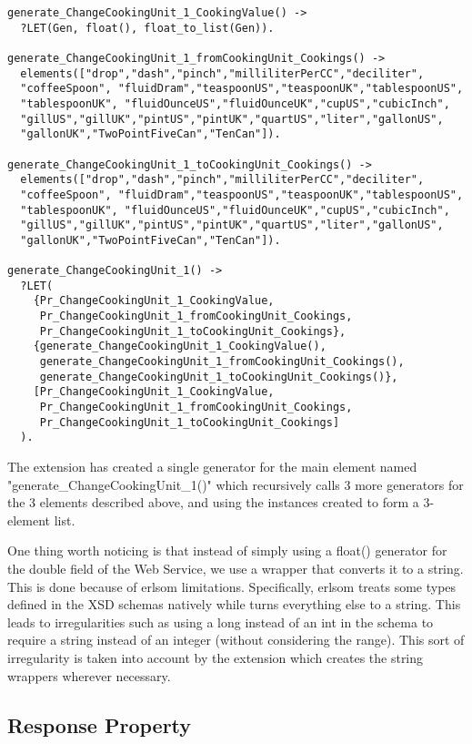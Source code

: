 \documentclass[11pt]{article} %
\begin{document}
\begin{lstlisting}
generate_ChangeCookingUnit_1_CookingValue() ->
  ?LET(Gen, float(), float_to_list(Gen)).

generate_ChangeCookingUnit_1_fromCookingUnit_Cookings() ->
  elements(["drop","dash","pinch","milliliterPerCC","deciliter",
  "coffeeSpoon", "fluidDram","teaspoonUS","teaspoonUK","tablespoonUS",
  "tablespoonUK", "fluidOunceUS","fluidOunceUK","cupUS","cubicInch",
  "gillUS","gillUK","pintUS","pintUK","quartUS","liter","gallonUS",
  "gallonUK","TwoPointFiveCan","TenCan"]).

generate_ChangeCookingUnit_1_toCookingUnit_Cookings() ->
  elements(["drop","dash","pinch","milliliterPerCC","deciliter",
  "coffeeSpoon", "fluidDram","teaspoonUS","teaspoonUK","tablespoonUS",
  "tablespoonUK", "fluidOunceUS","fluidOunceUK","cupUS","cubicInch",
  "gillUS","gillUK","pintUS","pintUK","quartUS","liter","gallonUS",
  "gallonUK","TwoPointFiveCan","TenCan"]).

generate_ChangeCookingUnit_1() ->
  ?LET(
    {Pr_ChangeCookingUnit_1_CookingValue,
     Pr_ChangeCookingUnit_1_fromCookingUnit_Cookings,
     Pr_ChangeCookingUnit_1_toCookingUnit_Cookings},
    {generate_ChangeCookingUnit_1_CookingValue(),    
     generate_ChangeCookingUnit_1_fromCookingUnit_Cookings(),
     generate_ChangeCookingUnit_1_toCookingUnit_Cookings()},
    [Pr_ChangeCookingUnit_1_CookingValue,
     Pr_ChangeCookingUnit_1_fromCookingUnit_Cookings, 
     Pr_ChangeCookingUnit_1_toCookingUnit_Cookings]
  ).
\end{lstlisting}

The extension has created a single generator for the main element named "generate\_ChangeCookingUnit\_1()" which recursively calls 3 more generators for the 3 elements described above, and using the instances created to form a 3-element list. 

One thing worth noticing is that instead of simply using a float() generator for the double field of the Web Service, we use a wrapper that converts it to a string. This is done because of erlsom limitations. Specifically, erlsom treats some types defined in the XSD schemas natively while turns everything else to a string. This leads to irregularities such as using a long instead of an int in the schema to require a string instead of an integer (without considering the range). This sort of irregularity is taken into account by the extension which creates the string wrappers wherever necessary.

\subsection{Response Property}
\end{document}
